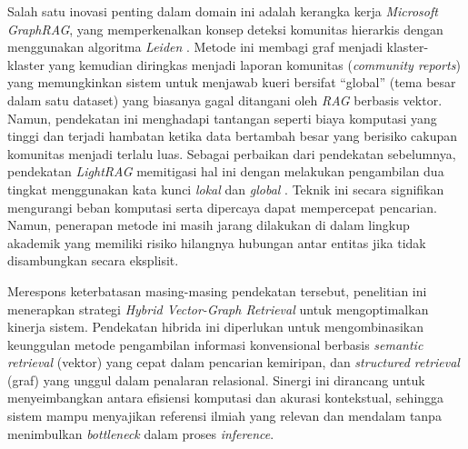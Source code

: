 Salah satu inovasi penting dalam domain ini adalah kerangka kerja \textit{Microsoft GraphRAG}, yang memperkenalkan konsep deteksi komunitas hierarkis dengan menggunakan algoritma \textit{Leiden} \citep{edge2025localglobalgraphrag}. Metode ini membagi graf menjadi klaster-klaster yang kemudian diringkas menjadi laporan komunitas (\textit{community reports}) yang memungkinkan sistem untuk menjawab kueri bersifat ``global'' (tema besar dalam satu dataset) yang biasanya gagal ditangani oleh \textit{RAG} berbasis vektor. Namun, pendekatan ini menghadapi tantangan seperti biaya komputasi yang tinggi dan terjadi hambatan ketika data bertambah besar yang berisiko cakupan komunitas menjadi terlalu luas. Sebagai perbaikan dari pendekatan sebelumnya, pendekatan \textit{LightRAG} memitigasi hal ini dengan melakukan pengambilan dua tingkat menggunakan kata kunci \textit{lokal} dan \textit{global} \citep{guo2025lightragsimplefastretrievalaugmented}. Teknik ini secara signifikan mengurangi beban komputasi serta dipercaya dapat mempercepat pencarian. Namun, penerapan metode ini masih jarang dilakukan di dalam lingkup akademik yang memiliki risiko hilangnya hubungan antar entitas jika tidak disambungkan secara eksplisit.

Merespons keterbatasan masing-masing pendekatan tersebut, penelitian ini menerapkan strategi \textit{Hybrid Vector-Graph Retrieval} untuk mengoptimalkan kinerja sistem. Pendekatan hibrida ini diperlukan untuk mengombinasikan keunggulan metode pengambilan informasi konvensional berbasis \textit{semantic retrieval} (vektor) yang cepat dalam pencarian kemiripan, dan \textit{structured retrieval} (graf) yang unggul dalam penalaran relasional. Sinergi ini dirancang untuk menyeimbangkan antara efisiensi komputasi dan akurasi kontekstual, sehingga sistem mampu menyajikan referensi ilmiah yang relevan dan mendalam tanpa menimbulkan \textit{bottleneck} dalam proses \textit{inference}.